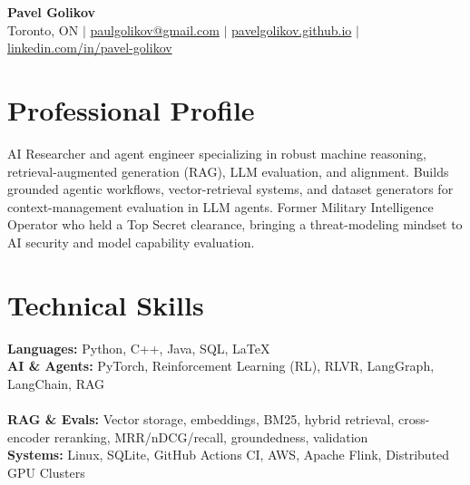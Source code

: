 \documentclass[9pt, letterpaper]{extarticle}
\begin{document}
\begin{center}
    {\Huge \textbf{Pavel Golikov}} \\ \vspace{1pt}
    Toronto, ON $\vert$ 
    \href{mailto:paulgolikov@gmail.com}{paulgolikov@gmail.com} $\vert$ 
    \href{https://pavelgolikov.github.io/}{pavelgolikov.github.io} $\vert$ 
    \href{https://www.linkedin.com/in/pavel-golikov-b266211b6/}{linkedin.com/in/pavel-golikov}
\end{center}

\section{Professional Profile}
\vspace{0pt}
    \small{AI Researcher and agent engineer specializing in robust machine reasoning, retrieval-augmented generation (RAG), LLM evaluation, and alignment. Builds grounded agentic workflows, vector-retrieval systems, and dataset generators for context-management evaluation in LLM agents. Former Military Intelligence Operator who held a Top Secret clearance, bringing a threat-modeling mindset to AI security and model capability evaluation.}

\section{Technical Skills}
\begin{itemize}[leftmargin=0.15in, label={}]
    \small{\item{
     \textbf{Languages:}{ Python, C++, Java, SQL, LaTeX} \\
     \textbf{AI \& Agents:}{ PyTorch, Reinforcement Learning (RL), RLVR, LangGraph, LangChain, RAG} \\
      \\
     \textbf{RAG \& Evals:}{ Vector storage, embeddings, BM25, hybrid retrieval, cross-encoder reranking, MRR/nDCG/recall, groundedness, validation} \\
     \textbf{Systems:}{ Linux, SQLite, GitHub Actions CI, AWS, Apache Flink, Distributed GPU Clusters}
    }}
\end{itemize}
\end{document}
